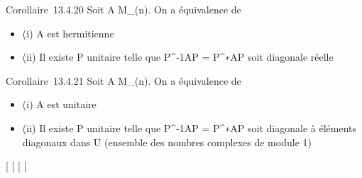 \documentclass[]{article}
\begin{document}
Corollaire~13.4.20 Soit A \in M_(n). On a équivalence de

\begin{itemize}
\itemsep1pt\parskip0pt
\item
  (i) A est hermitienne
\item
  (ii) Il existe P unitaire telle que P^-1AP =
  P^∗AP soit diagonale réelle
\end{itemize}

Corollaire~13.4.21 Soit A \in M_(n). On a équivalence de

\begin{itemize}
\itemsep1pt\parskip0pt
\item
  (i) A est unitaire
\item
  (ii) Il existe P unitaire telle que P^-1AP =
  P^∗AP soit diagonale à éléments diagonaux dans U (ensemble
  des nombres complexes de module 1)
\end{itemize}

[
[
[
[
\end{document}
